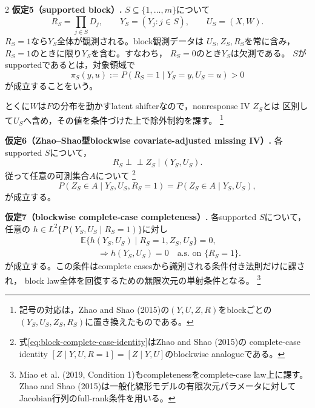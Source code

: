 \documentclass[a4paper,10pt]{article}
\newcommand{\E}{\mathbb E}
\newcommand{\indep}{\mathrel{\perp\!\!\!\perp}}
\begin{document}
\begin{multicols}{2}
\noindent\textbf{仮定5（supported block）.}
$S\subseteq\{1,\ldots,m\}$について
\begin{equation}
R_S=\prod_{j\in S}D_j,\qquad Y_S=(Y_j:j\in S),\qquad U_S=(X,W).
\label{eq:supported-block-definition}
\end{equation}
$R_S=1$なら$Y_S$全体が観測される。block観測データは
$U_S,Z_S,R_S$を常に含み，$R_S=1$のときに限り$Y_S$を含む。すなわち，
$R_S=0$のとき$Y_S$は欠測である。
$S$がsupportedであるとは，対象領域で
\begin{equation}
\pi_S(y,u):=P(R_S=1\mid Y_S=y,U_S=u)>0
\label{eq:block-positivity}
\end{equation}
が成立することをいう。

とくに$W$は$F$の分布を動かすlatent shifterなので，nonresponse IV $Z_S$とは
区別して$U_S$へ含め，その値を条件づけた上で除外制約を課す。%
\footnote{記号の対応は，Zhao and Shao (2015)の$(Y,U,Z,R)$をblockごとの
$(Y_S,U_S,Z_S,R_S)$に置き換えたものである。}

\noindent\textbf{仮定6（Zhao--Shao型blockwise covariate-adjusted missing IV）.}
各supported $S$について，
\begin{equation}
R_S\indep Z_S\mid(Y_S,U_S).
\label{eq:block-missing-iv-independence}
\end{equation}
従って任意の可測集合$A$について%
\footnote{式\eqref{eq:block-complete-case-identity}はZhao and Shao (2015)の
complete-case identity $[Z\mid Y,U,R=1]=[Z\mid Y,U]$のblockwise analogueである。}
\begin{equation}
P(Z_S\in A\mid Y_S,U_S,R_S=1)
=P(Z_S\in A\mid Y_S,U_S),
\label{eq:block-complete-case-identity}
\end{equation}
が成立する。

\noindent\textbf{仮定7（blockwise complete-case completeness）.}
各supported $S$について，任意の
$h\in L^2\{P(Y_S,U_S\mid R_S=1)\}$に対し
\begin{equation}
\begin{aligned}
&\E\{h(Y_S,U_S)\mid R_S=1,Z_S,U_S\}=0,\\
&\qquad\Longrightarrow h(Y_S,U_S)=0
\quad\text{a.s. on }\{R_S=1\}.
\end{aligned}
\label{eq:block-complete-case-completeness}
\end{equation}
が成立する。この条件はcomplete casesから識別される条件付き法則だけに課され，
block law全体を回復するための無限次元の単射条件となる。%
\footnote{Miao et al. (2019, Condition 1)もcompletenessをcomplete-case law上に課す。
Zhao and Shao (2015)は一般化線形モデルの有限次元パラメータに対して
Jacobian行列のfull-rank条件を用いる。}


\end{multicols}
\end{document}

